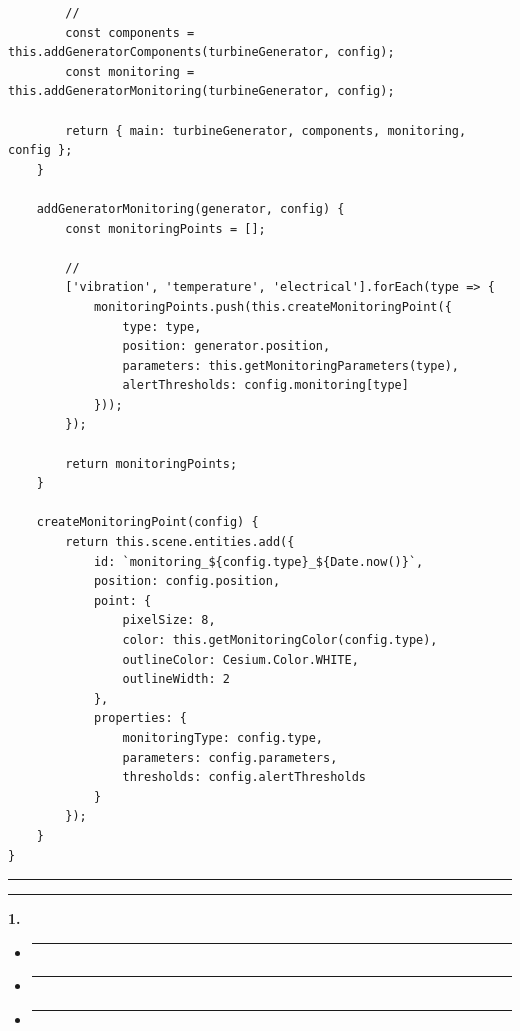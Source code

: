 \begin{verbatim}
        // 
        const components = this.addGeneratorComponents(turbineGenerator, config);
        const monitoring = this.addGeneratorMonitoring(turbineGenerator, config);
        
        return { main: turbineGenerator, components, monitoring, config };
    }
    
    addGeneratorMonitoring(generator, config) {
        const monitoringPoints = [];
        
        // 
        ['vibration', 'temperature', 'electrical'].forEach(type => {
            monitoringPoints.push(this.createMonitoringPoint({
                type: type,
                position: generator.position,
                parameters: this.getMonitoringParameters(type),
                alertThresholds: config.monitoring[type]
            }));
        });
        
        return monitoringPoints;
    }
    
    createMonitoringPoint(config) {
        return this.scene.entities.add({
            id: `monitoring_${config.type}_${Date.now()}`,
            position: config.position,
            point: {
                pixelSize: 8,
                color: this.getMonitoringColor(config.type),
                outlineColor: Cesium.Color.WHITE,
                outlineWidth: 2
            },
            properties: {
                monitoringType: config.type,
                parameters: config.parameters,
                thresholds: config.alertThresholds
            }
        });
    }
}
\end{verbatim}

\begin{center}\rule{0.5\linewidth}{0.5pt}\end{center}

\begin{center}\rule{0.5\linewidth}{0.5pt}\end{center}

\textbf{1. }

\begin{itemize}
\item
  \begin{center}\rule{0.5\linewidth}{0.5pt}\end{center}
\item
  \begin{center}\rule{0.5\linewidth}{0.5pt}\end{center}
\item
  \begin{center}\rule{0.5\linewidth}{0.5pt}\end{center}
\end{itemize}

